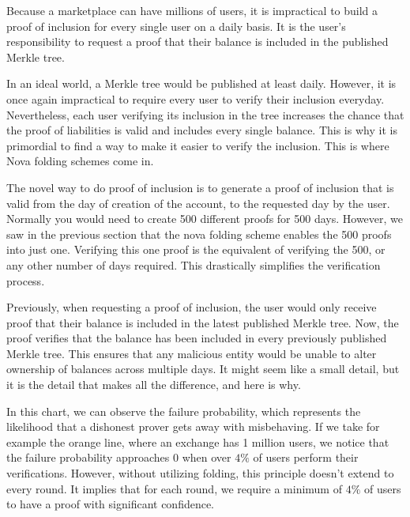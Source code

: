 Because a marketplace can have millions of users, it is impractical to build a proof of inclusion for every single user on a daily basis.
It is the user's responsibility to request a proof that their balance is included in the published Merkle tree.

In an ideal world, a Merkle tree would be published at least daily. However, it is once again impractical to require every user to verify their inclusion everyday.
Nevertheless, each user verifying its inclusion in the tree increases the chance that the proof of liabilities is valid and includes every single balance.
This is why it is primordial to find a way to make it easier to verify the inclusion. This is where Nova folding schemes come in.

The novel way to do proof of inclusion is to generate a proof of inclusion that is valid from the day of creation of the account, to the requested day by the user.
Normally you would need to create 500 different proofs for 500 days. However, we saw in the previous section that the nova folding scheme enables the 500 proofs into just one.
Verifying this one proof is the equivalent of verifying the 500, or any other number of days required.
This drastically simplifies the verification process.

Previously, when requesting a proof of inclusion, the user would only receive proof that their balance is included in the latest published Merkle tree. Now, the proof verifies that the balance has been included in every previously published Merkle tree.
This ensures that any malicious entity would be unable to alter ownership of balances across multiple days. It might seem like a small detail, but it is the detail that makes all the difference, and here is why.

In this chart, we can observe the failure probability, which represents the likelihood that a dishonest prover gets away with misbehaving.
If we take for example the orange line, where an exchange has 1 million users, we notice that the failure probability approaches 0 when over $4\%$ of users perform their verifications.
However, without utilizing folding, this principle doesn't extend to every round. It implies that for each round, we require a minimum of $4\%$ of users to have a proof with significant confidence.

